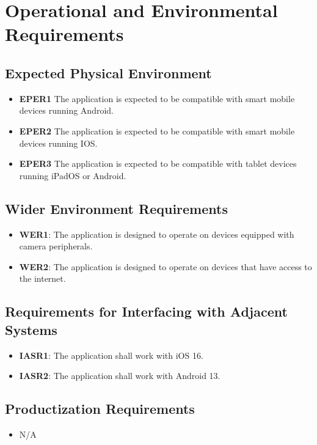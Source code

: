 \documentclass[12pt]{article}
\begin{document}
\section{Operational and Environmental Requirements}
\subsection{Expected Physical Environment}
\begin{itemize}
    \item \textbf{EPER1} The application is expected to be compatible with smart mobile devices running Android.
    \item \textbf{EPER2} The application is expected to be compatible with smart mobile devices running IOS.
    \item \textbf{EPER3} The application is expected to be compatible with tablet devices running iPadOS or Android. 
\end{itemize}
\subsection{Wider Environment Requirements}
\begin{itemize}
    \item \textbf{WER1}: The application is designed to operate on devices equipped with camera peripherals.
    \item \textbf{WER2}: The application is designed to operate on devices that have access to the internet. 
\end{itemize}
\subsection{Requirements for Interfacing with Adjacent Systems}
\begin{itemize}
    \item \textbf{IASR1}: The application shall work with iOS 16.
    \item \textbf{IASR2}: The application shall work with Android 13.
\end{itemize}
\subsection{Productization Requirements}
\begin{itemize}
    \item N/A
\end{itemize}
\end{document}
